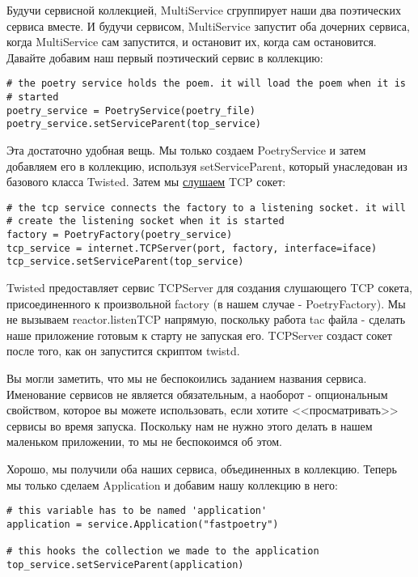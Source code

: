 Будучи сервисной коллекцией, MultiService сгруппирует 
наши два поэтических сервиса вместе. И будучи сервисом, 
MultiService запустит оба дочерних сервиса, когда 
MultiService сам запустится, и остановит их, когда сам остановится. 
Давайте добавим наш первый поэтический сервис в коллекцию:

 \begin{verbatim}
# the poetry service holds the poem. it will load the poem when it is
# started
poetry_service = PoetryService(poetry_file)
poetry_service.setServiceParent(top_service)
\end{verbatim} 


Эта достаточно удобная вещь. Мы только создаем 
PoetryService и затем добавляем его в коллекцию, 
используя setServiceParent, который унаследован из 
базового класса Twisted. Затем мы \href{http://github.com/jdavisp3/twisted-intro/blob/master/twisted-server-3/fastpoetry.py#L53}{слушаем} TCP сокет:

 \begin{verbatim}
# the tcp service connects the factory to a listening socket. it will
# create the listening socket when it is started
factory = PoetryFactory(poetry_service)
tcp_service = internet.TCPServer(port, factory, interface=iface)
tcp_service.setServiceParent(top_service)
\end{verbatim} 


Twisted предоставляет сервис TCPServer для создания 
слушающего TCP сокета, присоединенного к 
произвольной factory (в нашем случае - PoetryFactory). 
Мы не вызываем reactor.listenTCP напрямую, поскольку 
работа tac файла - сделать наше приложение готовым к старту 
не запуская его. TCPServer создаст сокет после того, как 
он запустится скриптом twistd.  


Вы могли заметить, что мы не беспокоились заданием 
названия сервиса. Именование сервисов не является 
обязательным, а наоборот - опциональным свойством, 
которое вы можете использовать, если хотите 
<<просматривать>> сервисы во время запуска. Поскольку 
нам не нужно этого делать в нашем маленьком приложении, 
то мы не беспокоимся об этом.


Хорошо, мы получили оба наших сервиса, объединенных 
в коллекцию. Теперь мы только сделаем Application и 
добавим нашу коллекцию в него:

 \begin{verbatim}
# this variable has to be named 'application'
application = service.Application("fastpoetry")

# this hooks the collection we made to the application
top_service.setServiceParent(application)
\end{verbatim} 


